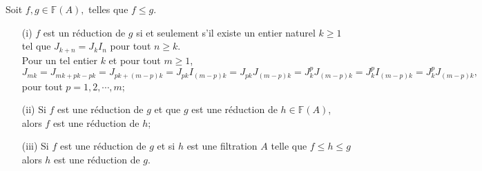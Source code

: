 \begin{maproposition}
	Soit $f,g \in \mathbb{F}(A),$ telles que $f \leqslant g$.
	\begin{enumerate}
		\label{maprop4}
		\item[(i)] $f$ est un réduction de $g$ si et seulement s'il existe un entier naturel $k \geqslant 1$ tel que $J_{k+n}  = J_{k}I_n$ pour tout $n \geqslant k$.\\ Pour un tel entier $k$ et pour tout $m \geqslant 1$, $J_{mk}=J_{mk+pk-pk}=J_{pk+(m-p)k}=J_{pk}I_{(m-p)k}=J_{pk}J_{(m-p)k}=J_{k}^{p}J_{(m-p)k}=J_{k}^{p}I_{(m-p)k}=J_{k}^{p}J_{(m-p)k},$\\ pour tout $p=1,2,\cdots,m$;
		\item[(ii)] Si $f$ est une réduction de $g$ et que $g$ est une réduction de $h \in \mathbb{F}(A)$, alors $f$ est une réduction de $h$;
		\item[(iii)] Si $f$ est une réduction de $g$ et si $h$ est une filtration $A$ telle que $f \leqslant h \leqslant g$ alors $h$ est une réduction de $g$.
	\end{enumerate}
\end{maproposition}
